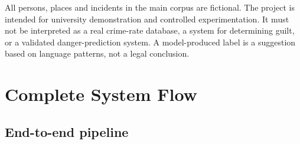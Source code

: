 \documentclass[12pt,a4paper]{report}
\begin{document}
All persons, places and incidents in the main corpus are fictional. The project is intended for university demonstration and controlled experimentation. It must not be interpreted as a real crime-rate database, a system for determining guilt, or a validated danger-prediction system. A model-produced label is a suggestion based on language patterns, not a legal conclusion.

\chapter{Complete System Flow}

\section{End-to-end pipeline}
\end{document}
